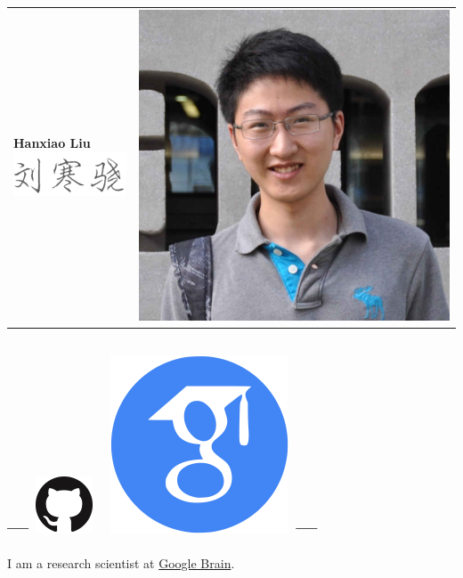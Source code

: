 \documentclass{article}
\begin{document}
\begin{tabular}{@{}ll}
    \textbf{\LARGE Hanxiao Liu} \newline
    \includegraphics*[draft,natwidth=90, natheight=36]{img/name-cn.png}
    &
    \includegraphics[natwidth=116, natheight=116]{img/profile.jpg} \\
\end{tabular}

\subsection*{--- \protect
\href{https://github.com/quark0}{\includegraphics[natwidth=24, natheight=24]{img/GitHub-Mark-64px.png}} \
\href{https://scholar.google.com/citations?user=IMkVH_8AAAAJ&hl=en}{\includegraphics[natwidth=24, natheight=24]{img/google-scholar.png}}
---
}
I am a research scientist at \href{https://ai.google/research/teams/brain}{Google Brain}.
\end{document}
